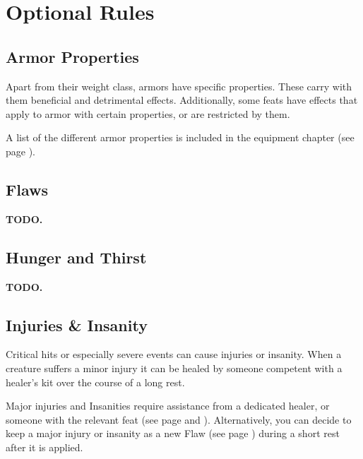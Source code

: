 \section{Optional Rules} \label{sec::optionalrules}

\subsection*{Armor Properties} \label{ssec::armorproperties}
    Apart from their weight class, armors have specific properties.
    These carry with them beneficial and detrimental effects.
    Additionally, some feats have effects that apply to armor with certain properties, or are restricted by them.

    A list of the different armor properties is included in the equipment chapter (see page \pageref{ch::equipment}).





\subsection*{Flaws} \label{ssec::flaws}
    \textbf{TODO.}

\subsection*{Hunger and Thirst} \label{ssec::hungerandthirst}
    \textbf{TODO.}

\subsection*{Injuries \& Insanity} \label{ssec::injuriesandinsanity}
    Critical hits or especially severe events can cause injuries or insanity.
    When a creature suffers a minor injury it can be healed by someone competent with a healer's kit over the course of a long rest.

    Major injuries and Insanities require assistance from a dedicated healer, or someone with the relevant feat (see page \pageref{feat::physician} and \pageref{feat::therapist}).
    Alternatively, you can decide to keep a major injury or insanity as a new Flaw (see page \pageref{ssec::flaws}) during a short rest after it is applied.

